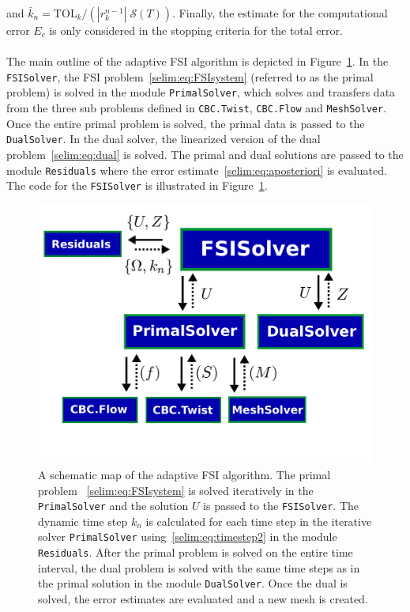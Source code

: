 and $\bar{k}_n = \mathrm{TOL}_k/(| r_k^{n-1} | \;\mathcal{S}(T))$. Finally,
the estimate for the computational error $E_c$ is only considered in
the stopping criteria for the total error.
\\\\
The main outline of the adaptive FSI algorithm is depicted in
Figure~\ref{selim:fig:adaptiveMAP}. In the \texttt{FSISolver}, the FSI
problem~\eqref{selim:eq:FSIsystem} (referred to as the primal problem)
is solved in the module \texttt{PrimalSolver}, which solves and
transfers data from the three sub problems defined in
\texttt{CBC.Twist}, \texttt{CBC.Flow} and \texttt{MeshSolver}. Once
the entire primal problem is solved, the primal data is passed to the
\texttt{DualSolver}. In the dual solver, the linearized version of the
dual problem~\eqref{selim:eq:dual} is solved. The primal and dual
solutions are passed to the module \texttt{Residuals} where the error
estimate~\eqref{selim:eq:aposteriori} is evaluated. The code for the
\texttt{FSISolver} is illustrated in Figure~\ref{selim:fig:adaptiveMAP}.
\begin{figure}
\label{selim:fig:adaptiveMAP}
\includegraphics[width=1.0\textwidth]{chapters/selim/pdf/adaptive.pdf}
\caption{A schematic map of the adaptive FSI algorithm. The primal
  problem ~\eqref{selim:eq:FSIsystem} is solved iteratively in the
  \texttt{PrimalSolver} and the solution $U$ is passed to the
  \texttt{FSISolver}. The dynamic time step $k_n$ is calculated for
  each time step in the iterative solver \texttt{PrimalSolver}
  using~\eqref{selim:eq:timestep2} in the module
  \texttt{Residuals}. After the primal problem is solved on the entire
  time interval, the dual problem is solved with the same time steps
  as in the primal solution in the module \texttt{DualSolver}. Once
  the dual is solved, the error estimates are evaluated and a new
  mesh is created.}
\end{figure}

